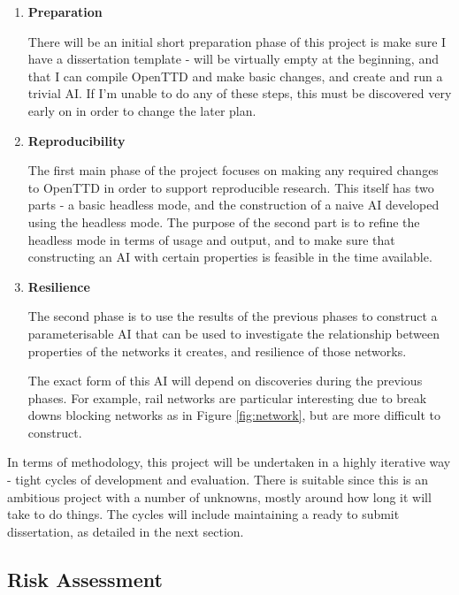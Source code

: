\documentclass[a4paper,11pt]{article}
\begin{document}
\begin{enumerate}
\addtocounter{enumi}{-1}
    \item \textbf{Preparation}

    There will be an initial short preparation phase of this project is make sure I have a dissertation template - will be virtually empty at the beginning, and that I can compile OpenTTD and make basic changes, and create and run a trivial AI. If I'm unable to do any of these steps, this must be discovered very early on in order to change the later plan.
    
    \item \textbf{Reproducibility}

    The first main phase of the project focuses on making any required changes to OpenTTD in order to support reproducible research. This itself has two parts - a basic headless mode, and the construction of a naive AI developed using the headless mode. The purpose of the second part is to refine the headless mode in terms of usage and output, and to make sure that constructing an AI with certain properties is feasible in the time available.
    
    \item \textbf{Resilience}

    The second phase is to use the results of the previous phases to construct a parameterisable AI that can be used to investigate the relationship between properties of the networks it creates, and resilience of those networks.

    The exact form of this AI will depend on discoveries during the previous phases. For example, rail networks are particular interesting due to break downs blocking networks as in Figure \ref{fig:network}, but are more difficult to construct.
    
\end{enumerate}

In terms of methodology, this project will be undertaken in a highly iterative way - tight cycles of development and evaluation. There is suitable since this is an ambitious project with a number of unknowns, mostly around how long it will take to do things. The cycles will include maintaining a ready to submit dissertation, as detailed in the next section.

\subsection{Risk Assessment}
\label{riskassessment}
\end{document}
